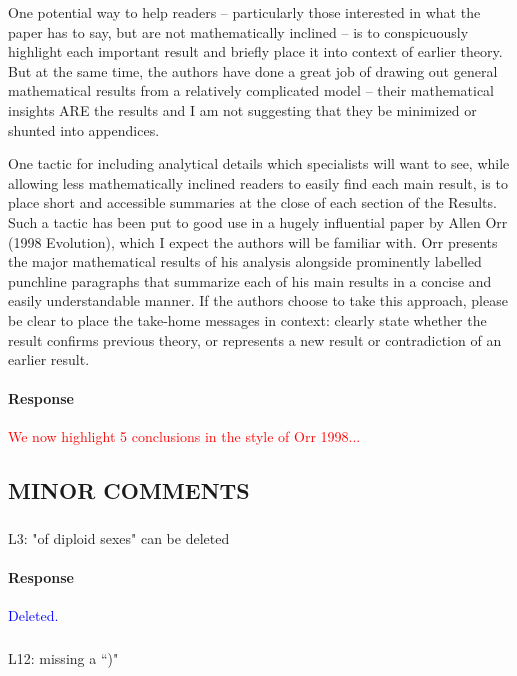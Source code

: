 \documentclass[10pt,letterpaper]{article}
\begin{document}
One potential way to help readers -- particularly those interested in what the paper has to say, but are not mathematically inclined -- is to conspicuously highlight each important result and briefly place it into context of earlier theory. But at the same time, the authors have done a great job of drawing out general mathematical results from a relatively complicated model -- their mathematical insights ARE the results and I am not suggesting that they be minimized or shunted into appendices.

One tactic for including analytical details which specialists will want to see, while allowing less mathematically inclined readers to easily find each main result, is to place short and accessible summaries at the close of each section of the Results. Such a tactic has been put to good use in a hugely influential paper by Allen Orr (1998 Evolution), which I expect the authors will be familiar with. Orr presents the major mathematical results of his analysis alongside prominently labelled punchline paragraphs that summarize each of his main results in a concise and easily understandable manner. If the authors choose to take this approach, please be clear to place the take-home messages in context: clearly state whether the result confirms previous theory, or represents a new result or contradiction of an earlier result.

\noindent\paragraph{Response}
\textcolor{red}{We now highlight 5 conclusions in the style of Orr 1998...}

\subsection{MINOR COMMENTS}

\noindent\subsubsection{}
L3: "of diploid sexes" can be deleted

\noindent\paragraph{Response}
\textcolor{blue}{Deleted.}

\noindent\subsubsection{}
L12: missing a ``)"
\end{document}

